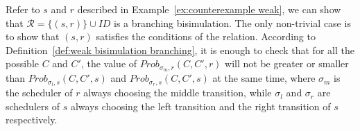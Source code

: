 \documentclass{LMCS}
\newcommand{\MC}[1]{\mathcal{#1}}
\newcommand{\MI}[1]{\mathit{#1}}
\newcommand{\MEASURE}{\mathit{Prob}}
\begin{document}
\begin{exa}\label{ex:weak branching bisimulation}
  Refer to $s$ and $r$ described in Example~\ref{ex:counterexample
    weak}, we can
  show that $\MC{R}=\{(s,r)\}\cup\MI{ID}$ is a branching
  bisimulation. The only non-trivial case is to show that $(s,r)$ satisfies the conditions of
   the relation. According to Definition~\ref{def:weak bisimulation
    branching}, it is enough to check that for all the possible $C$
  and $C'$, the value of $\MEASURE_{\sigma_m,r}(C,C',r)$ will not be
  greater or smaller than $\MEASURE_{\sigma_l,s}(C,C',s)$ and
  $\MEASURE_{\sigma_r,s}(C,C',s)$ at the same time, where $\sigma_m$
  is the scheduler of $r$ always choosing the middle transition, while
  $\sigma_l$ and $\sigma_r$ are schedulers of $s$ always choosing the
  left transition and the right transition of $s$ respectively.
\end{exa}
\end{document}
